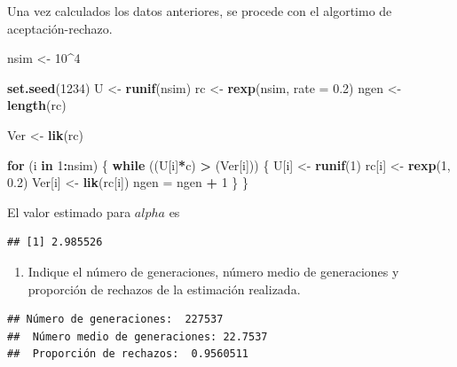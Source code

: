 \documentclass[
]{article}
\newenvironment{Shaded}{\begin{snugshade}}{\end{snugshade}}
\newcommand{\AttributeTok}[1]{\textcolor[rgb]{0.13,0.29,0.53}{#1}}
\newcommand{\ControlFlowTok}[1]{\textcolor[rgb]{0.13,0.29,0.53}{\textbf{#1}}}
\newcommand{\DecValTok}[1]{\textcolor[rgb]{0.00,0.00,0.81}{#1}}
\newcommand{\FloatTok}[1]{\textcolor[rgb]{0.00,0.00,0.81}{#1}}
\newcommand{\FunctionTok}[1]{\textcolor[rgb]{0.13,0.29,0.53}{\textbf{#1}}}
\newcommand{\NormalTok}[1]{#1}
\newcommand{\OtherTok}[1]{\textcolor[rgb]{0.56,0.35,0.01}{#1}}
\newcommand{\SpecialCharTok}[1]{\textcolor[rgb]{0.81,0.36,0.00}{\textbf{#1}}}
\providecommand{\tightlist}{%
  \setlength{\itemsep}{0pt}\setlength{\parskip}{0pt}}
\begin{document}
Una vez calculados los datos anteriores, se procede con el algortimo de
aceptación-rechazo.

\begin{Shaded}
\begin{Highlighting}[]
\NormalTok{nsim }\OtherTok{\textless{}{-}} \DecValTok{10}\SpecialCharTok{\^{}}\DecValTok{4}

\FunctionTok{set.seed}\NormalTok{(}\DecValTok{1234}\NormalTok{)}
\NormalTok{U }\OtherTok{\textless{}{-}} \FunctionTok{runif}\NormalTok{(nsim)}
\NormalTok{rc }\OtherTok{\textless{}{-}} \FunctionTok{rexp}\NormalTok{(nsim, }\AttributeTok{rate =} \FloatTok{0.2}\NormalTok{)}
\NormalTok{ngen }\OtherTok{\textless{}{-}} \FunctionTok{length}\NormalTok{(rc)}

\NormalTok{Ver }\OtherTok{\textless{}{-}} \FunctionTok{lik}\NormalTok{(rc)}

\ControlFlowTok{for}\NormalTok{ (i }\ControlFlowTok{in} \DecValTok{1}\SpecialCharTok{:}\NormalTok{nsim) \{}
  \ControlFlowTok{while}\NormalTok{ ((U[i]}\SpecialCharTok{*}\NormalTok{c) }\SpecialCharTok{\textgreater{}}\NormalTok{ (Ver[i])) \{}
\NormalTok{    U[i] }\OtherTok{\textless{}{-}} \FunctionTok{runif}\NormalTok{(}\DecValTok{1}\NormalTok{)}
\NormalTok{    rc[i] }\OtherTok{\textless{}{-}} \FunctionTok{rexp}\NormalTok{(}\DecValTok{1}\NormalTok{, }\FloatTok{0.2}\NormalTok{)}
\NormalTok{    Ver[i] }\OtherTok{\textless{}{-}} \FunctionTok{lik}\NormalTok{(rc[i])}
\NormalTok{    ngen }\OtherTok{=}\NormalTok{ ngen }\SpecialCharTok{+} \DecValTok{1}
\NormalTok{  \}}
\NormalTok{\}}
\end{Highlighting}
\end{Shaded}

El valor estimado para \(alpha\) es

\begin{verbatim}
## [1] 2.985526
\end{verbatim}

\begin{enumerate}
\def\labelenumi{\alph{enumi}.}
\setcounter{enumi}{1}
\tightlist
\item
  Indique el número de generaciones, número medio de generaciones y
  proporción de rechazos de la estimación realizada.
\end{enumerate}

\begin{verbatim}
## Número de generaciones:  227537 
##  Número medio de generaciones: 22.7537 
##  Proporción de rechazos:  0.9560511
\end{verbatim}
\end{document}
